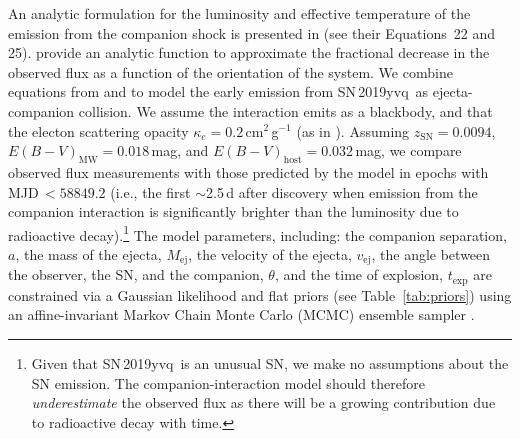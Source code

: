 \documentclass[twocolumn]{aastex63}
\newcommand{\sn}{SN\,2019yvq}
\begin{document}
An analytic formulation for the luminosity and effective temperature of the
emission from the companion shock is presented in \citet{Kasen10a} (see their
Equations~22 and 25). \citet{Brown12} provide an analytic function to
approximate the fractional decrease in the observed flux as a function of the
orientation of the system. We combine equations from \citet{Kasen10a} and
\citet{Brown12} to model the early emission from \sn\ as ejecta-companion
collision. We assume the interaction emits as a blackbody, and that the
electon scattering opacity $\kappa_e = 0.2$\,cm$^{2}$\,g$^{-1}$ (as in
\citealt{Kasen10a}). Assuming $z_\mathrm{SN} = 0.0094$, $E(B-V)_\mathrm{MW} =
0.018$\,mag, and $E(B-V)_\mathrm{host} = 0.032$\,mag, we compare observed flux
measurements with those predicted by the \citet{Kasen10a} model in epochs with
MJD$\,< 58849.2$ (i.e., the first $\sim$2.5\,d after discovery when emission
from the companion interaction is significantly brighter than the luminosity
due to radioactive decay).\footnote{Given that \sn\ is an unusual SN, we make
no assumptions about the SN emission. The companion-interaction model should
therefore \textit{underestimate} the observed flux as there will be a growing
contribution due to radioactive decay with time.} The model parameters,
including: the companion separation, $a$, the mass of the ejecta,
$M_\mathrm{ej}$, the velocity of the ejecta, $v_\mathrm{ej}$, the angle
between the observer, the SN, and the companion, $\theta$, and the time of
explosion, $t_\mathrm{exp}$ are constrained via a Gaussian likelihood and flat
priors (see Table~\ref{tab:priors}) using an affine-invariant
\citep{Goodman10} Markov Chain Monte Carlo (MCMC) ensemble sampler
\citep{Foreman-Mackey13}.
\end{document}
